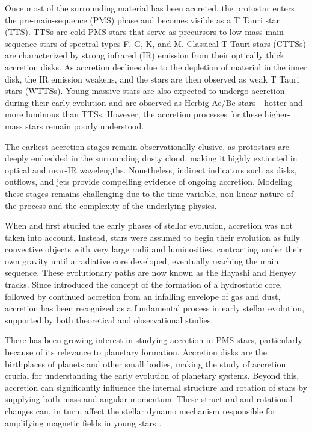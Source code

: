 \documentclass[12pt,a4paper]{article}
\begin{document}
Once most of the surrounding material has been accreted, the protostar enters the pre-main-sequence (PMS) phase and becomes visible as a T Tauri star (TTS). TTSs are cold PMS stars that serve as precursors to low-mass main-sequence stars of spectral types F, G, K, and M. Classical T Tauri stars (CTTSs) are characterized by strong infrared (IR) emission from their optically thick accretion disks. As accretion declines due to the depletion of material in the inner disk, the IR emission weakens, and the stars are then observed as weak T Tauri stars (WTTSs). Young massive stars are also expected to undergo accretion during their early evolution and are observed as Herbig Ae/Be stars—hotter and more luminous than TTSs. However, the accretion processes for these higher-mass stars remain poorly understood.

The earliest accretion stages remain observationally elusive, as protostars are deeply embedded in the surrounding dusty cloud, making it highly extincted in optical and near-IR wavelengths. Nonetheless, indirect indicators such as disks, outflows, and jets provide compelling evidence of ongoing accretion. Modeling these stages remains challenging due to the time-variable, non-linear nature of the process and the complexity of the underlying physics.

When \textcite{HenyeyEtAl1955} and \textcite{Hayashi1961} first studied the early phases of stellar evolution, accretion was not taken into account. Instead, stars were assumed to begin their evolution as fully convective objects with very large radii and luminosities, contracting under their own gravity until a radiative core developed, eventually reaching the main sequence. These evolutionary paths are now known as the Hayashi and Henyey tracks. Since \textcite{Larson1969} introduced the concept of the formation of a hydrostatic core, followed by continued accretion from an infalling envelope of gas and dust, accretion has been recognized as a fundamental process in early stellar evolution, supported by both theoretical and observational studies.

There has been growing interest in studying accretion in PMS stars, particularly because of its relevance to planetary formation. Accretion disks are the birthplaces of planets and other small bodies, making the study of accretion crucial for understanding the early evolution of planetary systems. Beyond this, accretion can significantly influence the internal structure and rotation of stars by supplying both mass and angular momentum. These structural and rotational changes can, in turn, affect the stellar dynamo mechanism responsible for amplifying magnetic fields in young stars \parencite[e.g.,][]{StelzerNeuhauser2001}.
\end{document}
